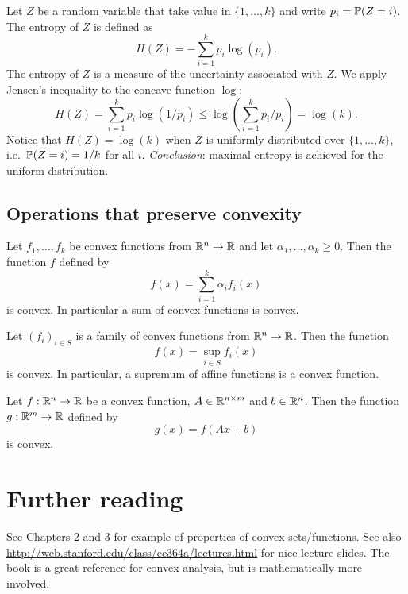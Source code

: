 \documentclass[11pt,nocut]{article}
\begin{document}
\begin{example}
	Let $Z$ be a random variable that take value in $\{1, \dots, k\}$ and write $p_i = \P(Z = i)$. The entropy of $Z$ is defined as
	$$
	H(Z) = - \sum_{i=1}^k p_i \log(p_i).
	$$
	The entropy of $Z$ is a measure of the uncertainty associated with $Z$.
	We apply Jensen's inequality to the concave function $\log$:
	$$
	H(Z) = \sum_{i=1}^k p_i \log(1/p_i) \leq \log\left(\sum_{i=1}^k p_i / p_i\right) = \log(k).
	$$
	Notice that $H(Z) = \log(k)$ when $Z$ is uniformly distributed over $\{1,\dots,k\}$, i.e.\ $\P(Z=i) = 1/k$ for all $i$. \emph{Conclusion}: maximal entropy is achieved for the uniform distribution.
\end{example}


\subsection{Operations that preserve convexity}

\begin{proposition}
	Let $f_1, \dots, f_k$ be convex functions from $\R^n \to \R$ and let $\alpha_1, \dots, \alpha_k \geq 0$. Then the function $f$ defined by
	$$
	f(x) = \sum_{i=1}^k \alpha_i f_i(x)
	$$
	is convex. In particular a sum of convex functions is convex.
\end{proposition}

\begin{proposition}
	Let $(f_i)_{i \in S}$ is a family of convex functions from $\R^n \to \R$. Then the function
	$$
	f(x) = \sup_{i \in S} f_i(x)
	$$
	is convex. In particular, a supremum of affine functions is a convex function.
\end{proposition}

\begin{proposition}
	Let $f: \R^n \to \R$ be a convex function, $A \in \R^{n \times m}$ and $b\in\R^n$.
	Then the function $g: \R^m \to \R$ defined by
	$$
	g(x) = f(Ax + b)
	$$
	is convex.
\end{proposition}


\section*{Further reading}

See \cite{boyd2004convex} Chapters 2 and 3 for example of properties of convex sets/functions. See also \url{http://web.stanford.edu/class/ee364a/lectures.html} for nice lecture slides.
The book \cite{rockafellar1970convex} is a great reference for convex analysis, but is mathematically more involved.


\vspace{1cm}
\centerline{}




\end{document}
